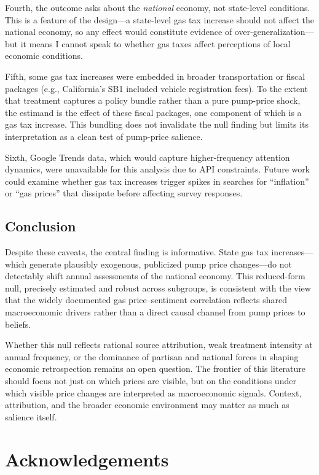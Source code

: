 \documentclass[12pt]{article}
\begin{document}
Fourth, the outcome asks about the \textit{national} economy, not state-level conditions. This is a feature of the design---a state-level gas tax increase should not affect the national economy, so any effect would constitute evidence of over-generalization---but it means I cannot speak to whether gas taxes affect perceptions of local economic conditions.

Fifth, some gas tax increases were embedded in broader transportation or fiscal packages (e.g., California's SB1 included vehicle registration fees). To the extent that treatment captures a policy bundle rather than a pure pump-price shock, the estimand is the effect of these fiscal packages, one component of which is a gas tax increase. This bundling does not invalidate the null finding but limits its interpretation as a clean test of pump-price salience.

Sixth, Google Trends data, which would capture higher-frequency attention dynamics, were unavailable for this analysis due to API constraints. Future work could examine whether gas tax increases trigger spikes in searches for ``inflation'' or ``gas prices'' that dissipate before affecting survey responses.

\subsection{Conclusion}

Despite these caveats, the central finding is informative. State gas tax increases---which generate plausibly exogenous, publicized pump price changes---do not detectably shift annual assessments of the national economy. This reduced-form null, precisely estimated and robust across subgroups, is consistent with the view that the widely documented gas price--sentiment correlation reflects shared macroeconomic drivers rather than a direct causal channel from pump prices to beliefs.

Whether this null reflects rational source attribution, weak treatment intensity at annual frequency, or the dominance of partisan and national forces in shaping economic retrospection remains an open question. The frontier of this literature should focus not just on which prices are visible, but on the conditions under which visible price changes are interpreted as macroeconomic signals. Context, attribution, and the broader economic environment may matter as much as salience itself.

\section*{Acknowledgements}
\end{document}
